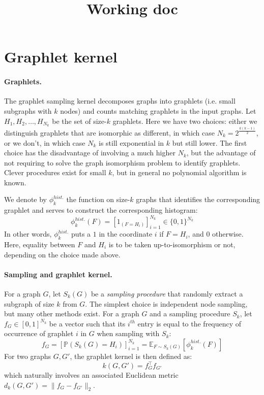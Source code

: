 \documentclass{article}
\title{Working doc}
\author{}
\date{}
\begin{document}
\maketitle

\section{Graphlet kernel}

\paragraph{Graphlets.} The graphlet sampling kernel decomposes graphs into graphlets (i.e. small subgraphs
with $k$ nodes) and counts matching graphlets in the input graphs. Let $H_1 , H_2 , \ldots , H_{N_k}$ be the set of size-$k$ graphlets. Here we have two choices: either we distinguish graphlets that are isomorphic as different, in which case $N_k = 2^{\frac{k(k-1)}{2}}$, or we don't, in which case $N_k$ is still exponential in $k$ but still lower. The first choice has the disadvantage of involving a much higher $N_k$, but the advantage of not requiring to solve the graph isomorphism problem to identify graphlets. Clever procedures exist for small $k$, but in general no polynomial algorithm is known.

We denote by $\phi_{k}^{hist.}$ the function on size-$k$ graphs that identifies the corresponding graphlet and serves to construct the corresponding histogram:
\[
\phi_k^{hist.}(F) = \left[ 1_{(F = H_i)}\right]_{i=1}^{N_k} \in \{0,1\}^{N_k}
\]
In other words, $\phi_k^{hist.}$ puts a $1$ in the coordinate $i$ if $F=H_i$, and $0$ otherwise. Here, equality between $F$ and $H_i$ is to be taken up-to-isomorphism or not, depending on the choice made above.

\paragraph{Sampling and graphlet kernel.} For a graph $G$, let $S_k(G)$ be a \emph{sampling procedure} that randomly extract a subgraph of size $k$ from $G$. The simplest choice is independent node sampling, but many other methods exist. For a graph $G$ and a sampling procedure $S_k$, let $f_G \in [0,1]^{N_k}$ be a vector such that its $i^{th}$ entry is equal to the frequency of
occurrence of graphlet $i$ in $G$ when sampling with $S_k$:
\[
f_G = \left[\mathbb{P}(S_k(G) = H_i)\right]_{i=1}^{N_k} = \mathbb{E}_{F \sim S_k(G)} [\phi_k^{hist.}(F)]
\]
For two graphs $G,G'$, the graphlet kernel is then defined as:
\begin{equation} \label{eq:graphlet_kernel}
k(G , G') = f_{G}^\top f_{G'}
\end{equation}
which naturally involves an associated Euclidean metric $d_k(G,G') = \|f_G - f_{G'}\|_2$.
\end{document}
